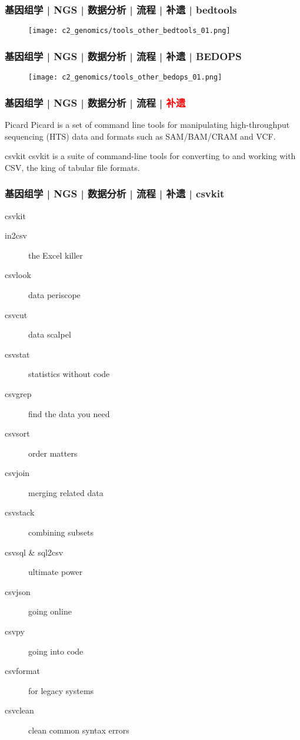 \begin{frame}
  \frametitle{基因组学 | NGS | 数据分析 | 流程 | 补遗 | bedtools}
  \begin{figure}
    \centering
    \texttt{[image: c2\_genomics/tools\_other\_bedtools\_01.png]}
  \end{figure}
\end{frame}

\begin{frame}
  \frametitle{基因组学 | NGS | 数据分析 | 流程 | 补遗 | BEDOPS}
  \begin{figure}
    \centering
    \texttt{[image: c2\_genomics/tools\_other\_bedops\_01.png]}
  \end{figure}
\end{frame}

\begin{frame}
  \frametitle{基因组学 | NGS | 数据分析 | 流程 | \textcolor{red}{补遗}}
  \begin{block}{Picard}
    Picard is a set of command line tools for manipulating high-throughput sequencing (HTS) data and formats such as SAM/BAM/CRAM and VCF.
  \end{block}
  \pause
  \begin{block}{csvkit}
    csvkit is a suite of command-line tools for converting to and working with CSV, the king of tabular file formats.
  \end{block}
\end{frame}

\begin{frame}
  \frametitle{基因组学 | NGS | 数据分析 | 流程 | 补遗 | csvkit}
  \begin{block}{csvkit}
    \begin{description}
      \item[in2csv] the Excel killer
      \item[csvlook] data periscope
      \item[csvcut] data scalpel
      \item[csvstat] statistics without code
      \item[csvgrep] find the data you need
      \item[csvsort] order matters
      \item[csvjoin] merging related data
      \item[csvstack] combining subsets
      \item[csvsql \& sql2csv] ultimate power
      \item[csvjson] going online
      \item[csvpy] going into code
      \item[csvformat] for legacy systems
      \item[csvclean] clean common syntax errors
    \end{description}
  \end{block}
\end{frame}

